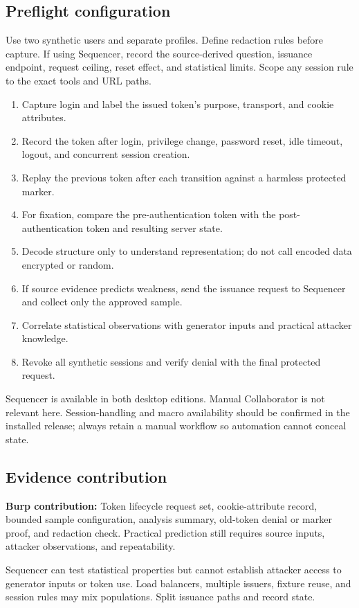 \documentclass[11pt]{article}
\newcommand{\weekfield}[2]{%
  \Needspace{5\baselineskip}
  \subsection*{#1}
  #2
}
\newcommand{\burpevidence}[1]{\textbf{Burp contribution:} #1}
\begin{document}
\weekfield{Preflight configuration}{Use two synthetic users and separate
profiles. Define redaction rules before capture. If using Sequencer, record the
source-derived question, issuance endpoint, request ceiling, reset effect, and
statistical limits. Scope any session rule to the exact tools and URL paths.}

\begin{procedurebox}
\begin{enumerate}
  \item Capture login and label the issued token's purpose, transport, and cookie attributes.
  \item Record the token after login, privilege change, password reset, idle timeout, logout, and concurrent session creation.
  \item Replay the previous token after each transition against a harmless protected marker.
  \item For fixation, compare the pre-authentication token with the post-authentication token and resulting server state.
  \item Decode structure only to understand representation; do not call encoded data encrypted or random.
  \item If source evidence predicts weakness, send the issuance request to Sequencer and collect only the approved sample.
  \item Correlate statistical observations with generator inputs and practical attacker knowledge.
  \item Revoke all synthetic sessions and verify denial with the final protected request.
\end{enumerate}
\end{procedurebox}

\begin{editionbox}
Sequencer is available in both desktop editions. Manual Collaborator is not
relevant here. Session-handling and macro availability should be confirmed in
the installed release; always retain a manual workflow so automation cannot
conceal state.
\end{editionbox}

\weekfield{Evidence contribution}{\burpevidence{Token lifecycle request set,
cookie-attribute record, bounded sample configuration, analysis summary, old-token
denial or marker proof, and redaction check.} Practical prediction still requires
source inputs, attacker observations, and repeatability.}

\begin{troubleshootingbox}
Sequencer can test statistical properties but cannot establish attacker access
to generator inputs or token use. Load balancers, multiple issuers, fixture reuse,
and session rules may mix populations. Split issuance paths and record state.
\end{troubleshootingbox}
\end{document}
